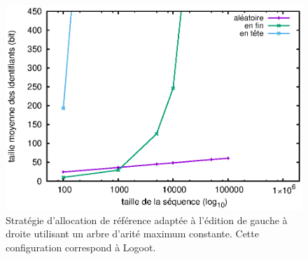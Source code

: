 \begin{figure}
  \centering
  \includegraphics[width=.8\textwidth]{./img/lseq/logoot.eps}
  \caption{\label{fig:lseq:logoot}Stratégie d'allocation de référence adaptée à
    l'édition de gauche à droite utilisant un arbre d'arité maximum
    constante. Cette configuration correspond à Logoot.}
\end{figure}


